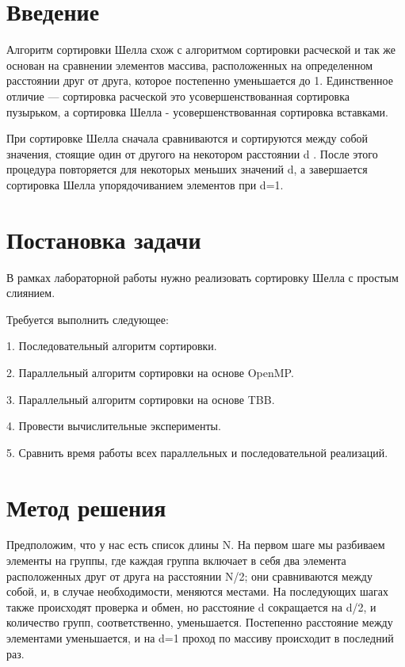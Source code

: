 \documentclass{report}
\begin{document}
\setcounter{page}{2}

\tableofcontents
\newpage

\section*{Введение}
 Алгоритм сортировки Шелла схож с алгоритмом сортировки расческой и так же основан на сравнении элементов массива, расположенных на определенном расстоянии друг от друга, которое постепенно уменьшается до 1. Единственное отличие — сортировка расческой это усовершенствованная сортировка пузырьком, а сортировка Шелла - усовершенствованная сортировка вставками.
\par
При сортировке Шелла сначала сравниваются и сортируются между собой значения, стоящие один от другого на некотором расстоянии d . После этого процедура повторяется для некоторых меньших значений d, а завершается сортировка Шелла упорядочиванием элементов при d=1.
\newpage

\section*{Постановка задачи}
В рамках лабораторной работы нужно реализовать сортировку Шелла с простым слиянием.
\par
Требуется выполнить следующее:
\par
1.	Последовательный алгоритм сортировки.
\par
2.	Параллельный алгоритм сортировки на основе OpenMP.
\par
3.	Параллельный алгоритм сортировки на основе TBB.
\par
4.	Провести вычислительные эксперименты.
\par
5.	Сравнить время работы всех параллельных и последовательной реализаций.
\newpage

\section*{Метод решения}
Предположим, что у нас есть список длины N. На первом шаге мы разбиваем элементы на группы, где каждая группа включает в себя два элемента расположенных друг от друга на расстоянии N/2; они сравниваются между собой, и, в случае необходимости, меняются местами. На последующих шагах также происходят проверка и обмен, но расстояние d сокращается на d/2, и количество групп, соответственно, уменьшается. Постепенно расстояние между элементами уменьшается, и на d=1 проход по массиву происходит в последний раз. 
\newpage
\end{document}
